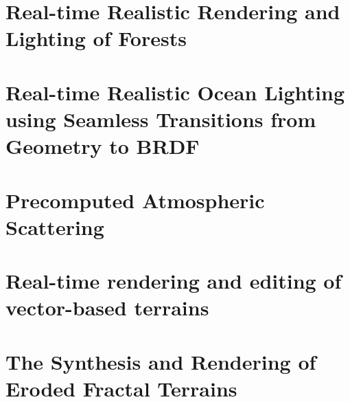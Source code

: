 \section{Real-time Realistic Rendering and Lighting of Forests}


\section{Real-time Realistic Ocean Lighting using Seamless Transitions from Geometry to BRDF}


\section{Precomputed Atmospheric Scattering}


\section{Real-time rendering and editing of vector-based terrains}


\section{The Synthesis and Rendering of Eroded Fractal Terrains}


